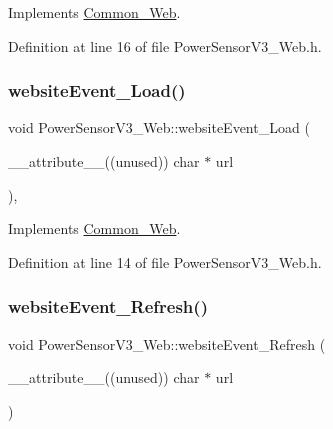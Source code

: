 Implements \hyperlink{class_common___web_a898e3fd8cc6384ecbbbd79c8a3a13b62}{Common\+\_\+\+Web}.



Definition at line 16 of file Power\+Sensor\+V3\+\_\+\+Web.\+h.

\mbox{\label{class_power_sensor_v3___web_ac5792ce60508b9789927171c6aa10945}} 
\subsubsection{\texorpdfstring{website\+Event\+\_\+\+Load()}{websiteEvent\_Load()}}
{\footnotesize\ttfamily void Power\+Sensor\+V3\+\_\+\+Web\+::website\+Event\+\_\+\+Load (\begin{DoxyParamCaption}\item[{\+\_\+\+\_\+attribute\+\_\+\+\_\+((unused)) char $\ast$}]{url }\end{DoxyParamCaption})\hspace{0.3cm}{\ttfamily [inline]}, {\ttfamily [virtual]}}



Implements \hyperlink{class_common___web_a5ce0d5ce6f63279c3b624371d8a76211}{Common\+\_\+\+Web}.



Definition at line 14 of file Power\+Sensor\+V3\+\_\+\+Web.\+h.

\mbox{\label{class_power_sensor_v3___web_aa5516c0a4c5daa0f27a89e86abb0db26}} 
\subsubsection{\texorpdfstring{website\+Event\+\_\+\+Refresh()}{websiteEvent\_Refresh()}}
{\footnotesize\ttfamily void Power\+Sensor\+V3\+\_\+\+Web\+::website\+Event\+\_\+\+Refresh (\begin{DoxyParamCaption}\item[{\+\_\+\+\_\+attribute\+\_\+\+\_\+((unused)) char $\ast$}]{url }\end{DoxyParamCaption})\hspace{0.3cm}{\ttfamily [virtual]}}



